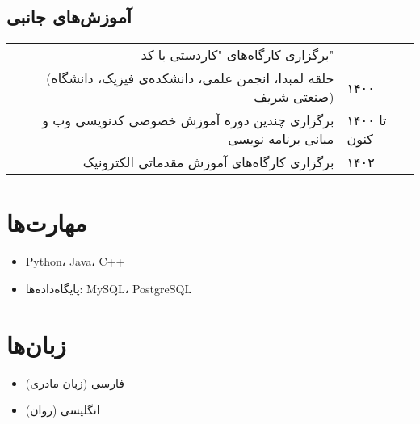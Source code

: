 \documentclass{persian-resume}
\begin{document}
\subsection*{
    آموزش‌های جانبی
}

\begin{tabular*}{\textwidth}{@{\extracolsep{\fill}} rl}
برگزاری کارگاه‌های "کاردستی با کد"\\ (حلقه لمبدا، انجمن علمی، دانشکده‌ی فیزیک‌، دانشگاه صنعتی شریف) & ۱۴۰۰\\
برگزاری چندین دوره آموزش خصوصی کدنویسی وب و مبانی برنامه نویسی & ۱۴۰۰ تا کنون\\
برگزاری کارگاه‌های آموزش مقدماتی الکترونیک & ۱۴۰۲
\end{tabular*}

\section{مهارت‌ها}
\begin{itemize}
  \item Python، Java، C++
  \item پایگاه‌داده‌ها: MySQL، PostgreSQL
\end{itemize}

\section{زبان‌ها}
\begin{itemize}
  \item فارسی (زبان مادری)
  \item انگلیسی (روان)
\end{itemize}
\end{document}
